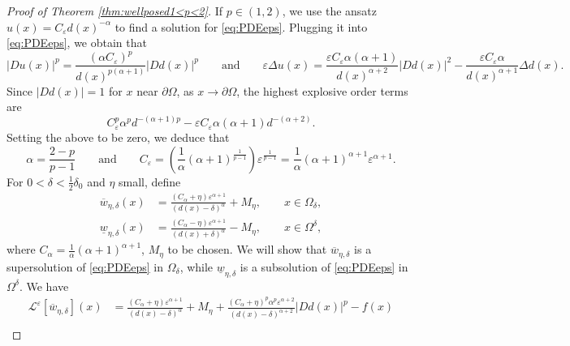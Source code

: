 \documentclass[11pt,reqno]{amsart}
\numberwithin{figure}{section}
\theoremstyle{plain}
\theoremstyle{remark}
\numberwithin{equation}{section}
\begin{document}
\begin{appendices}
\begin{proof} [Proof of Theorem \ref{thm:wellposed1<p<2}] If $p\in (1,2)$, we use the ansatz $ u(x) = C_\varepsilon d(x)^{-\alpha}$ to find a solution for \eqref{eq:PDEeps}. Plugging it into \eqref{eq:PDEeps}, we obtain that 
\begin{equation*}
    |Du (x)|^p = \frac{(\alpha C_\varepsilon)^p }{d(x)^{p(\alpha+1)}}|D d(x)|^p \qquad\text{and}\qquad\varepsilon\Delta u(x) = \frac{\varepsilon C_\varepsilon\alpha(\alpha+1)}{d(x)^{\alpha+2}}|D d(x)|^2 - \frac{\varepsilon C_\varepsilon\alpha}{d(x)^{\alpha+1}}\Delta d(x).
\end{equation*}
Since $|D d(x)| = 1$ for $x$ near $\partial\Omega$, as $x\to \partial \Omega$, the highest explosive order terms are
\begin{equation*}
         C_\varepsilon^p \alpha^p d^{-(\alpha+1)p}  -\varepsilon C_\varepsilon \alpha(\alpha+1)d^{-(\alpha+2)}.
\end{equation*}
Setting the above to be zero, we deduce that 
\begin{equation}\label{e:relation}
    \displaystyle\alpha = \frac{2-p}{p-1} \qquad\text{and}\qquad C_\varepsilon = \left(\frac{1}{\alpha}(\alpha+1)^\frac{1}{p-1}\right) \varepsilon^{\frac{1}{p-1}} = \frac{1}{\alpha}(\alpha+1)^{\alpha+1}\varepsilon^{\alpha+1}.
\end{equation}
For $0<\delta < \frac{1}{2}\delta_0$ and $\eta$ small, define
\begin{equation*}
\begin{split}
    \overline{w}_{\eta,\delta}(x) &= \frac{(C_\alpha+\eta)\varepsilon^{\alpha+1}}{(d(x)-\delta)^\alpha} + M_\eta, \qquad x\in \Omega_\delta,\\
    \underline{w}_{\eta,\delta}(x) &= \frac{(C_\alpha-\eta)\varepsilon^{\alpha+1}}{(d(x)+\delta)^\alpha} - M_\eta, \qquad x\in \Omega^\delta,
\end{split}
\end{equation*}
where $C_\alpha = \frac{1}{\alpha} (\alpha+1)^{\alpha+1} $, $M_\eta$ to be chosen. We will show that $\overline{w}_{\eta,\delta}$ is a supersolution of \eqref{eq:PDEeps} in $\Omega_\delta$, while $\underline{w}_{\eta,\delta}$ is a subsolution of \eqref{eq:PDEeps} in $\Omega^\delta$. We have 
\begin{align*}
    \mathcal{L}^\varepsilon\left[\overline{w}_{\eta,\delta}\right](x) &= \frac{ (C_\alpha + \eta)\varepsilon^{\alpha+1}}{(d(x)-\delta)^\alpha} + M_\eta + \frac{(C_\alpha+\eta)^p \alpha^p\varepsilon^{\alpha+2}}{(d(x)-\delta)^{\alpha+2}}|D d(x)|^p - f(x) \\

\end{align*}
\end{proof}
\end{appendices}
\end{document}
